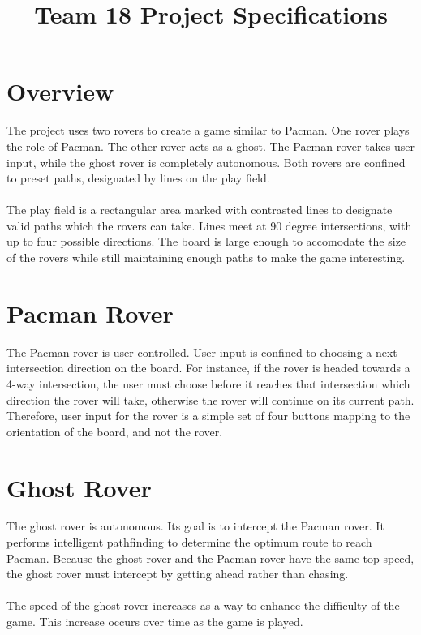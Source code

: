 \documentclass[12pt,letterpaper]{article}
\title{Team 18 Project Specifications}
\begin{document}
\maketitle

\section{Overview}
The project uses two rovers to create a game similar to Pacman. One rover plays the role of Pacman. The other rover acts as a ghost. The Pacman rover takes user input, while the ghost rover is completely autonomous. Both rovers are confined to preset paths, designated by lines on the play field. 

\paragraph{}
The play field is a rectangular area marked with contrasted lines to designate valid paths which the rovers can take. Lines meet at 90 degree intersections, with up to four possible directions. The board is large enough to accomodate the size of the rovers while still maintaining enough paths to make the game interesting.

\section{Pacman Rover}
The Pacman rover is user controlled. User input is confined to choosing a next-intersection direction on the board. For instance, if the rover is headed towards a 4-way intersection, the user must choose before it reaches that intersection which direction the rover will take, otherwise the rover will continue on its current path. Therefore, user input for the rover is a simple set of four buttons mapping to the orientation of the board, and not the rover.

\section{Ghost Rover}
The ghost rover is autonomous. Its goal is to intercept the Pacman rover. It performs intelligent pathfinding to determine the optimum route to reach Pacman. Because the ghost rover and the Pacman rover have the same top speed, the ghost rover must intercept by getting ahead rather than chasing. 

\paragraph{}
The speed of the ghost rover increases as a way to enhance the difficulty of the game. This increase occurs over time as the game is played.
\end{document}
